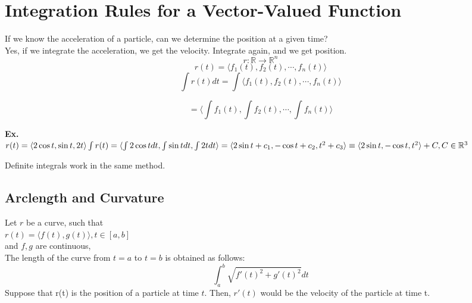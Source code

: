 \documentclass[]{article}
\title{\docTitle}
\author{\docAuthor}
\date{\today}
\begin{document}
\maketitle
\section*{Integration Rules for a Vector-Valued Function}
If we know the acceleration of a particle, can we determine the position at a given time?\\
Yes, if we integrate the acceleration, we get the velocity. Integrate again, and we get position.\\
\begin{equation*}
    r: \mathbb{R} \to \mathbb{R}^n
\end{equation*}
\begin{equation*}
    r(t) = \langle{f_1(t),f_2(t), \cdots,f_n(t)}\rangle
\end{equation*}
\begin{equation*}
    \int r(t)dt = \int\langle{f_1(t),f_2(t), \cdots,f_n(t)}\rangle
\end{equation*}

\begin{equation*}
    =\langle{\int f_1(t),\int f_2(t), \cdots,\int f_n(t)}\rangle
\end{equation*}

\textbf{Ex.}\\
$r(t) = \langle{2\cos{t},\sin{t},2t}\rangle\\
\int{r(t)} = \langle{\int 2\cos{t}dt,\int\sin{t}dt,\int 2t dt}\rangle\\
= \langle{2\sin{t} + c_1,-\cos{t}+c_2,t^2+c_3}\rangle \equiv \langle{2\sin{t},-\cos{t},t^2}\rangle + C, C\in\mathbb{R}^3$

Definite integrals work in the same method.\\

\subsection*{Arclength and Curvature}
Let $r$ be a curve, such that\\
$r(t) = \langle{f(t),g(t)}\rangle, t\in[a,b]$\\
and $f, g$ are continuous,\\

The length of the curve from $t = a$ to $t = b$ is obtained as follows:\\
\begin{equation*}
    \int_a^b\sqrt{f'(t)^2+g'(t)^2}dt
\end{equation*}
Suppose that r(t) is the position of a particle at time $t$. Then, $r'(t)$ would be the velocity of the particle at time t.\\
\end{document}
